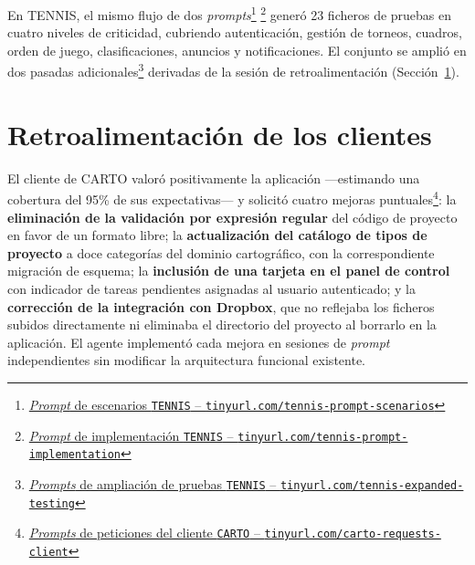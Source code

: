 En \ac{TENNIS}, el mismo flujo de dos \textit{prompts}\footnote{\href{https://github.com/alu0101549491/TFG-Fabian-Gonzalez-Lence/blob/main/resources/prompts/5-TennisTournamentManager/5-TestingDeLaAplicacion/test-scenarios.prompt.md}{\textit{Prompt} de escenarios \texttt{TENNIS} -- \texttt{tinyurl.com/tennis-prompt-scenarios}}} \footnote{\href{https://github.com/alu0101549491/TFG-Fabian-Gonzalez-Lence/blob/main/resources/prompts/5-TennisTournamentManager/5-TestingDeLaAplicacion/test-implementations.prompt.md}{\textit{Prompt} de implementación \texttt{TENNIS} -- \texttt{tinyurl.com/tennis-prompt-implementation}}} generó 23 ficheros de pruebas en cuatro niveles de criticidad, cubriendo autenticación, gestión de torneos, cuadros, orden de juego, clasificaciones, anuncios y notificaciones. El conjunto se amplió en dos pasadas adicionales\footnote{\href{https://github.com/alu0101549491/TFG-Fabian-Gonzalez-Lence/tree/main/resources/prompts/5-TennisTournamentManager/5-TestingDeLaAplicacion}{\textit{Prompts} de ampliación de pruebas \texttt{TENNIS} -- \texttt{tinyurl.com/tennis-expanded-testing}}} derivadas de la sesión de retroalimentación (Sección~\ref{sec:dev-client-feedback}).

\section{Retroalimentación de los clientes} \label{sec:dev-client-feedback}

El cliente de \ac{CARTO} valoró positivamente la aplicación ---estimando una cobertura del 95\% de sus expectativas--- y solicitó cuatro mejoras puntuales\footnote{\href{https://github.com/alu0101549491/TFG-Fabian-Gonzalez-Lence/tree/main/resources/prompts/4-CartographicProjectManager/6-PeticionesDelCliente}{\textit{Prompts} de peticiones del cliente \texttt{CARTO} -- \texttt{tinyurl.com/carto-requests-client}}}: la \textbf{eliminación de la validación por expresión regular} del código de proyecto en favor de un formato libre; la \textbf{actualización del catálogo de tipos de proyecto} a doce categorías del dominio cartográfico, con la correspondiente migración de esquema; la \textbf{inclusión de una tarjeta en el panel de control} con indicador de tareas pendientes asignadas al usuario autenticado; y la \textbf{corrección de la integración con Dropbox}, que no reflejaba los ficheros subidos directamente ni eliminaba el directorio del proyecto al borrarlo en la aplicación. El agente implementó cada mejora en sesiones de \textit{prompt} independientes sin modificar la arquitectura funcional existente.

